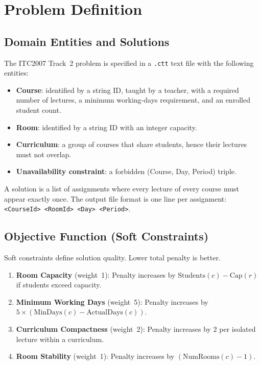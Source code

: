 \documentclass[11pt,letterpaper]{article}
\begin{document}
\section{Problem Definition}
\subsection{Domain Entities and Solutions}
The ITC2007 Track~2 problem is specified in a \texttt{.ctt} text file with the following entities:
\begin{itemize}[nosep]
  \item \textbf{Course}: identified by a string ID, taught by a teacher, with a required number of lectures, a minimum working-days requirement, and an enrolled student count.
  \item \textbf{Room}: identified by a string ID with an integer capacity.
  \item \textbf{Curriculum}: a group of courses that share students, hence their lectures must not overlap.
  \item \textbf{Unavailability constraint}: a forbidden (Course, Day, Period) triple.
\end{itemize}

A solution is a list of assignments where every lecture of every course must appear exactly once. The output file format is one line per assignment: \texttt{<CourseId> <RoomId> <Day> <Period>}.

\subsection{Objective Function (Soft Constraints)}
Soft constraints define solution quality. Lower total penalty is better.
\begin{enumerate}[label=\textbf{S\arabic*.},nosep]
  \item \textbf{Room Capacity} (weight~1): Penalty increases by $\text{Students}(c) - \text{Cap}(r)$ if students exceed capacity.
  \item \textbf{Minimum Working Days} (weight~5): Penalty increases by $5 \times (\text{MinDays}(c) - \text{ActualDays}(c))$.
  \item \textbf{Curriculum Compactness} (weight~2): Penalty increases by $2$ per isolated lecture within a curriculum.
  \item \textbf{Room Stability} (weight~1): Penalty increases by $(\text{NumRooms}(c) - 1)$.
\end{enumerate}
\end{document}
